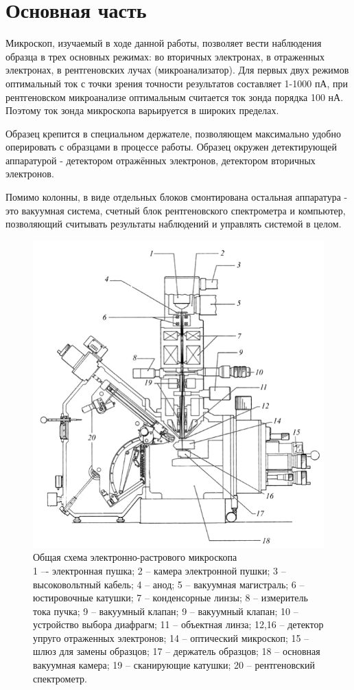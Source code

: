 \documentclass[a4paper, 12pt]{article}
\begin{document}
	\section{Основная часть}
	Микроскоп, изучаемый в ходе данной работы, позволяет вести наблюдения образца в трех основных режимах: во вторичных электронах, в отраженных электронах, в рентгеновских лучах (микроанализатор). Для первых двух режимов оптимальный ток с точки зрения точности результатов составляет 1-1000 пА, при рентгеновском микроанализе оптимальным считается ток зонда порядка 100 нА. Поэтому ток зонда микроскопа варьируется в широких пределах.\par
	Образец крепится в специальном держателе, позволяющем максимально удобно оперировать с образцами в процессе работы. Образец окружен детектирующей аппаратурой - детектором отражённых электронов, детектором вторичных электронов.\par
	Помимо колонны, в виде отдельных блоков смонтирована остальная аппаратура - это вакуумная система, счетный блок рентгеновского спектрометра и компьютер, позволяющий считывать результаты наблюдений и управлять системой в целом.\par
	\begin{figure}[h]
		\centering
		\includegraphics{Microscope_schematic}
		\caption{Общая схема электронно-растрового микроскопа\\
		1 –- электронная пушка; 2 -- камера электронной пушки; 3 -- высоковольтный кабель; 4 -- анод; 5 -- вакуумная магистраль; 6 -- юстировочные катушки; 7 -- конденсорные линзы; 8 -- измеритель тока пучка; 9 -- вакуумный клапан;  9 -- вакуумный клапан; 10 -- устройство выбора диафрагм; 11 -- объектная линза; 12,16 -- детектор упруго отраженных электронов; 14 -- оптический микроскоп; 15 -- шлюз для замены образцов; 17 -- держатель образцов; 18 -- основная вакуумная камера; 19 -- сканирующие катушки; 20 -- рентгеновский спектрометр.
		}
		\label{microscope_scheme}
	\end{figure}
\end{document}
